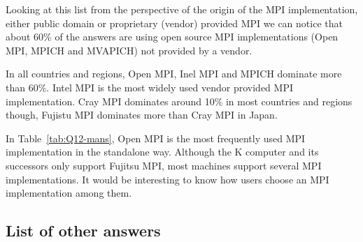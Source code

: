 
Looking at this list from the perspective of the origin of the MPI
implementation, either public domain or proprietary (vendor) provided MPI we can
notice that about 60\% of the answers are using open source MPI
implementations (Open MPI, MPICH and MVAPICH)  not provided by a
vendor. 

In all countries and regions, Open MPI, Inel MPI and MPICH dominate
more than 60\%. Intel MPI is the most widely used vendor provided MPI
implementation. Cray MPI dominates around 10\% in most countries and
regions though, Fujistu MPI dominates more than Cray MPI in Japan.

In Table~\ref{tab:Q12-mans}, Open MPI is the most frequently used MPI
implementation in the standalone way.  Although the K computer and its
successors only support Fujitsu MPI, most machines support several
MPI implementations. It would be interesting to know how users choose
an MPI implementation among them.



\subsection{List of other answers}

\begin{report}
\begin{itemize}

\end{itemize}
\end{report}
